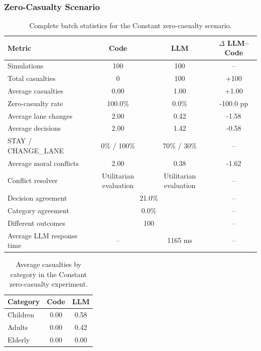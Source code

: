 \documentclass[10pt,a4paper]{article}
\begin{document}
\subsubsection{Zero-Casualty Scenario}

\begin{table}[H]
\centering
\small
\begin{tabular}{lccc}
\toprule
Metric & Code & LLM & $\Delta$ LLM--Code \\
\midrule
Simulations & 100 & 100 & -- \\
Total casualties & 0 & 100 & +100 \\
Average casualties & 0.00 & 1.00 & +1.00 \\
Zero-casualty rate & 100.0\% & 0.0\% & -100.0 pp \\
Average lane changes & 2.00 & 0.42 & -1.58 \\
Average decisions & 2.00 & 1.42 & -0.58 \\
STAY / CHANGE\_LANE & 0\% / 100\% & 70\% / 30\% & -- \\
Average moral conflicts & 2.00 & 0.38 & -1.62 \\
Conflict resolver & Utilitarian evaluation & Utilitarian evaluation & -- \\
Decision agreement & \multicolumn{2}{c}{21.0\%} & -- \\
Category agreement & \multicolumn{2}{c}{0.0\%} & -- \\
Different outcomes & \multicolumn{2}{c}{100} & -- \\
Average LLM response time & -- & 1165 ms & -- \\
\bottomrule
\end{tabular}
\caption{Complete batch statistics for the Constant zero-casualty scenario.}
\label{tab:app-constant-zero-casualty}
\end{table}


\begin{table}[H]
\centering
\small
\begin{tabular}{lcc}
\toprule
Category & Code & LLM \\
\midrule
Children & 0.00 & 0.58 \\
Adults   & 0.00 & 0.42 \\
Elderly  & 0.00 & 0.00 \\
\bottomrule
\end{tabular}
\caption{Average casualties by category in the Constant zero-casualty
experiment.}
\label{tab:app-constant-zero-casualty-categories}
\end{table}
\end{document}
